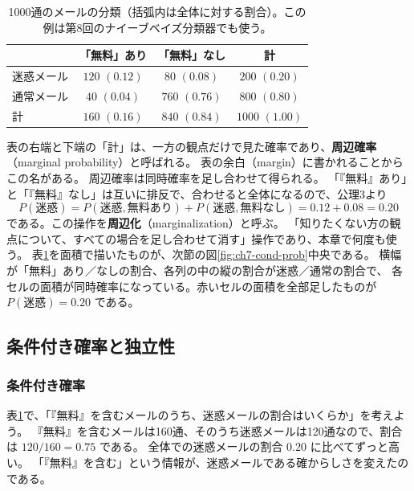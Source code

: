 \begin{table}[H]
  \centering
  \caption{1000通のメールの分類（括弧内は全体に対する割合）。この例は第8回のナイーブベイズ分類器でも使う。}
  \label{tab:ch7-spam}
  \begin{tabular}{l|cc|c}
    \hline
     & 「無料」あり & 「無料」なし & 計 \\
    \hline\hline
    迷惑メール & $120$ $(0.12)$ & $80$ $(0.08)$ & $200$ $(0.20)$ \\
    通常メール & $40$ $(0.04)$ & $760$ $(0.76)$ & $800$ $(0.80)$ \\
    \hline
    計 & $160$ $(0.16)$ & $840$ $(0.84)$ & $1000$ $(1.00)$ \\
    \hline
  \end{tabular}
\end{table}

表の右端と下端の「計」は、一方の観点だけで見た確率であり、\textbf{周辺確率}（marginal probability）と呼ばれる。
表の余白（margin）に書かれることからこの名がある。
周辺確率は同時確率を足し合わせて得られる。
「『無料』あり」と「『無料』なし」は互いに排反で、合わせると全体になるので、公理3より
\begin{equation}
  P(\text{迷惑}) = P(\text{迷惑}, \text{無料あり}) + P(\text{迷惑}, \text{無料なし}) = 0.12 + 0.08 = 0.20
  \label{eq:ch7-sum-rule}
\end{equation}
である。この操作を\textbf{周辺化}（marginalization）と呼ぶ。
「知りたくない方の観点について、すべての場合を足し合わせて消す」操作であり、本章で何度も使う。
表\ref{tab:ch7-spam}を面積で描いたものが、次節の図\ref{fig:ch7-cond-prob}中央である。
横幅が「無料」あり／なしの割合、各列の中の縦の割合が迷惑／通常の割合で、
各セルの面積が同時確率になっている。赤いセルの面積を全部足したものが $P(\text{迷惑}) = 0.20$ である。


\subsection{条件付き確率と独立性}

\subsubsection{条件付き確率}

表\ref{tab:ch7-spam}で、「『無料』を含むメールのうち、迷惑メールの割合はいくらか」を考えよう。
『無料』を含むメールは160通、そのうち迷惑メールは120通なので、割合は $120/160 = 0.75$ である。
全体での迷惑メールの割合 $0.20$ に比べてずっと高い。
「『無料』を含む」という情報が、迷惑メールである確からしさを変えたのである。


